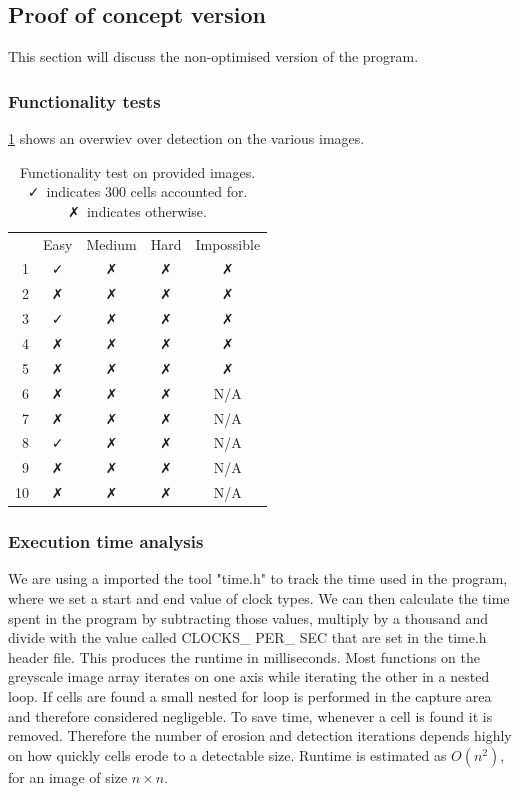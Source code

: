 \documentclass[a4paper, english]{article}
\numberwithin{equation}{section}
\begin{document}
\subsection{Proof of concept version}\label{sec:poctest}
This section will discuss the non-optimised version of the program.
\subsubsection{Functionality tests}
\cref{tbl:pocfunc} shows an overwiev over detection on the various images.
\begin{table}
    \centering
    \caption{Functionality test on provided images. \faCheck \ indicates 300 cells accounted for. \faClose \ indicates otherwise.}\label{tbl:pocfunc}
    \begin{tabular}{rcccc}
           & Easy     & Medium   & Hard     & Impossible \\
        1  & \faCheck & \faClose & \faClose & \faClose   \\
        2  & \faClose & \faClose & \faClose & \faClose   \\
        3  & \faCheck & \faClose & \faClose & \faClose   \\
        4  & \faClose & \faClose & \faClose & \faClose   \\
        5  & \faClose & \faClose & \faClose & \faClose   \\
        6  & \faClose & \faClose & \faClose & N/A        \\
        7  & \faClose & \faClose & \faClose & N/A        \\
        8  & \faCheck & \faClose & \faClose & N/A        \\
        9  & \faClose & \faClose & \faClose & N/A        \\
        10 & \faClose & \faClose & \faClose & N/A        \\
    \end{tabular}
\end{table}
\subsubsection{Execution time analysis}
We are using a imported the tool "time.h" to track the time used in the program, where we set a start and end value of clock types. We can then calculate the time spent in the program by subtracting those values, multiply by a thousand and divide with the value called CLOCKS\_ PER\_ SEC that are set in the time.h header file. This produces the runtime in milliseconds.\newline
Most functions on the greyscale image array iterates on one axis while iterating the other in a nested loop. If cells are found a small nested for loop is performed in the capture area and therefore considered negligeble. To save time, whenever a cell is found it is removed. Therefore the number of erosion and detection iterations depends highly on how quickly cells erode to a detectable size.
Runtime is estimated as \(O(n^2)\), for an image of size \(n\times n\).
\end{document}
